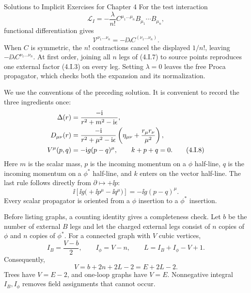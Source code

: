 \begin{bankssolutions}{Solutions to Implicit Exercises for Chapter 4}
For the test interaction
\begin{equation*}
 \mathcal L_I=-\frac{\lambda}{n!}
 C^{\mu_1\ldots\mu_n}B_{\mu_1}\cdots B_{\mu_n},
\end{equation*}
functional differentiation gives
\begin{equation*}
 \mathcal V^{\nu_1\ldots\nu_n}
 =-\ii\lambda C^{(\nu_1\ldots\nu_n)}.
 \tag{4.I.7}
\end{equation*}
When $C$ is symmetric, the $n!$ contractions cancel the displayed $1/n!$,
leaving $-\ii\lambda C^{\nu_1\ldots\nu_n}$.  At first order, joining all
$n$ legs of (4.I.7) to source points reproduces one external factor (4.I.3)
on every leg.  Setting $\lambda=0$ leaves the free Proca propagator, which
checks both the expansion and its normalization.

We use the conventions of the preceding solution.  It is convenient to
record the three ingredients once:
\begin{align*}
 \Delta(r)&=\frac{-\mathrm{i}}{r^2+m^2-\mathrm{i}\epsilon},\notag\\
 D_{\mu\nu}(r)&=
 \frac{-\mathrm{i}}{r^2+\mu^2-\mathrm{i}\epsilon}
 \left(\eta_{\mu\nu}+\frac{r_\mu r_\nu}{\mu^2}\right),\notag\\
 V^\mu(p,q)&=-\mathrm{i} g(p-q)^\mu,
 \qquad k+p+q=0.
 \tag{4.I.8}
\end{align*}
Here $m$ is the scalar mass, $p$ is the incoming momentum on a $\phi$
half-line, $q$ is the incoming momentum on a $\phi^*$ half-line, and $k$
enters on the vector half-line.
The last rule follows directly from $\partial\mapsto+\ii p$:
\begin{equation*}
 \ii\left[\ii g\bigl(+\ii p^\mu-\ii q^\mu\bigr)\right]
 =-\ii g(p-q)^\mu.
\end{equation*}
Every scalar propagator is oriented from a $\phi$ insertion to a
$\phi^*$ insertion.

Before listing graphs, a counting identity gives a completeness check.  Let
$b$ be the number of external $B$ legs and let the charged external legs
consist of $n$ copies of $\phi$ and $n$ copies of $\phi^*$.  For a connected
graph with $V$ cubic vertices,
\begin{equation*}
 I_B=\frac{V-b}{2},
 \qquad I_\phi=V-n,
 \qquad L=I_B+I_\phi-V+1.
\end{equation*}
Consequently,
\begin{equation*}
 V=b+2n+2L-2=E+2L-2.
 \tag{4.I.9}
\end{equation*}
Trees have $V=E-2$, and one-loop graphs have $V=E$.  Nonnegative integral
$I_B,I_\phi$ removes field assignments that cannot occur.


\end{bankssolutions}
